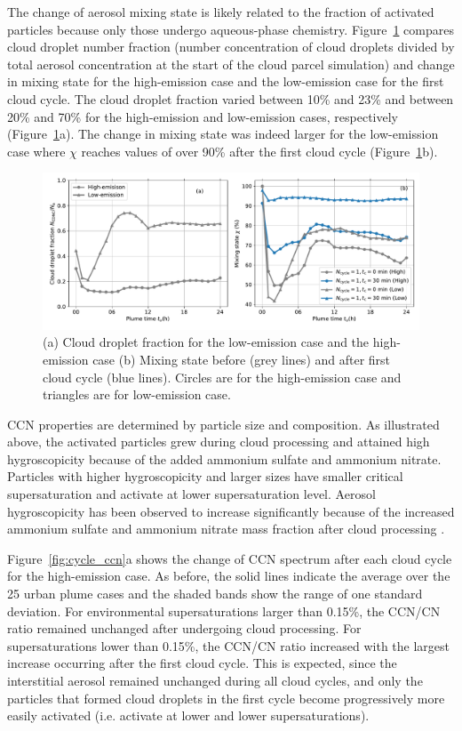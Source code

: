 \documentclass[edeposit,fullpage]{uiucthesis2009}
\begin{document}
The change of aerosol mixing state is likely related to the
  fraction of activated particles because only those undergo aqueous-phase chemistry. 
  Figure~\ref{fig:chi-cdnc} compares cloud droplet
  number fraction (number concentration of cloud droplets divided by
  total aerosol concentration at the start of the cloud parcel
  simulation) and change in mixing state for the high-emission case
  and the low-emission case for the first cloud cycle. The cloud
  droplet fraction varied between 10\% and 23\% and between 20\% and
  70\% for the high-emission and low-emission cases, respectively
  (Figure~\ref{fig:chi-cdnc}a). The change in mixing state was indeed
  larger for the low-emission case where $\chi$ reaches values of
  over 90\%  after the first cloud cycle
  (Figure~\ref{fig:chi-cdnc}b). 
\begin{figure}
    \centering
    \includegraphics[scale=0.5]{chap3_figs/fig10.pdf}
    \caption{(a) Cloud droplet fraction for the low-emission
        case and the high-emission case (b) Mixing state before
        (grey lines) and after first cloud cycle (blue lines). Circles
        are for the high-emission case and triangles are for
        low-emission case.}
    \label{fig:chi-cdnc}
\end{figure}

CCN properties are determined by particle size and composition. As
illustrated above, the activated particles grew during cloud
processing and attained high hygroscopicity because of the added
ammonium sulfate and ammonium nitrate. Particles with higher
hygroscopicity and larger sizes have smaller critical supersaturation
and activate at lower supersaturation level. Aerosol hygroscopicity has been 
observed to increase significantly because of the
increased ammonium sulfate and ammonium nitrate mass fraction after
cloud processing \citep{Henning2014,Christiansen2020, Saliba2020}.

Figure~\ref{fig:cycle_ccn}a shows the change of CCN spectrum after
each cloud cycle for the high-emission case. As before, the
solid lines indicate the average over the 25 urban plume cases and the
shaded bands show the range of one standard deviation. For
environmental supersaturations larger than 0.15\%, the CCN/CN ratio
remained unchanged after undergoing cloud processing. For
supersaturations lower than 0.15\%, the CCN/CN ratio increased with
the largest increase occurring after the first cloud cycle. This is
expected, since the interstitial aerosol remained unchanged during all
cloud cycles, and only the particles that formed cloud droplets in the
first cycle become progressively more easily activated (i.e. activate
at lower and lower supersaturations).
\end{document}
